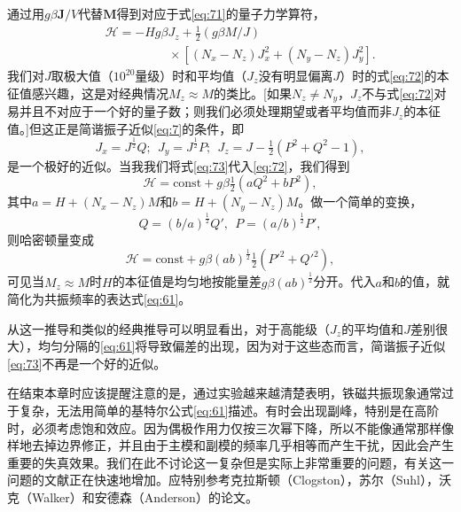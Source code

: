 \documentclass{article}
\begin{document}
通过用$g\beta\mathbf{J}/V$代替$\mathbf{M}$得到对应于式\eqref{eq:71}的量子力学算符，
\begin{eqnarray} \label{eq:72}
&&\mathcal{H}=-Hg\beta J_z+\tfrac{1}{2}(g\beta M/J)\nonumber\\
&&\phantom{~~~~~~~~~~~~~~~~~~~~~~~}\times[(N_x-N_z)J_x^2+(N_y-N_z)J_y^2].
\end{eqnarray}
我们对$J$取极大值（$10^{20}量级$）时和平均值（$J_z$没有明显偏离$J$）时的式\eqref{eq:72}的本征值感兴趣，这是对经典情况$M_z\approx M$的类比。[如果$N_z\neq N_y$，$J_z$不与式\eqref{eq:72}对易并且不对应于一个好的量子数；则我们必须处理期望或者平均值而非$J_z$的本征值。]但这正是简谐振子近似\eqref{eq:7}的条件，即
\begin{equation} \label{eq:73}
J_x=J^{\frac{1}{2}}Q;~~J_y=J^{\frac{1}{2}}P;~~J_z=J-\tfrac{1}{2}(P^2+Q^2-1),
\end{equation}
是一个极好的近似。当我我们将式\eqref{eq:73}代入\eqref{eq:72}，我们得到
\begin{equation} \label{eq:74}
\mathcal{H}=\text{const}+g\beta\tfrac{1}{2}(aQ^2+bP^2),
\end{equation}
其中$a=H+(N_x-N_z)M$和$b=H+(N_y-N_z)M$。做一个简单的变换，
\begin{equation} \label{eq:75}
Q=(b/a)^{\frac{1}{2}}Q',~~P=(a/b)^{\frac{1}{2}}P',
\end{equation}
则哈密顿量变成
\begin{equation} \label{eq:76}
\mathcal{H}=\text{const}+g\beta(ab)^{\frac{1}{2}}\tfrac{1}{2}(P'^2+Q'^2),
\end{equation}
可见当$M_z\approx M$时$H$的本征值是均匀地按能量差$g\beta(ab)^\frac{1}{2}$分开。代入$a$和$b$的值，就简化为共振频率的表达式\eqref{eq:61}。

从这一推导和类似的经典推导可以明显看出，对于高能级（$J_z$的平均值和$J$差别很大），均匀分隔的\eqref{eq:61}将导致偏差的出现，因为对于这些态而言，简谐振子近似\eqref{eq:73}不再是一个好的近似。

在结束本章时应该提醒注意的是，通过实验越来越清楚表明，铁磁共振现象通常过于复杂，无法用简单的基特尔公式\eqref{eq:61}描述。有时会出现副峰，特别是在高阶时，必须考虑饱和效应。因为偶极作用力仅按三次幂下降，所以不能像通常那样像样地去掉边界修正，并且由于主模和副模的频率几乎相等而产生干扰，因此会产生重要的失真效果。我们在此不讨论这一复杂但是实际上非常重要的问题，有关这一问题的文献正在快速地增加。应特别参考克拉斯顿（Clogston），苏尔（Suhl），沃克（Walker）和安德森（Anderson）的论文。

\end{document}
